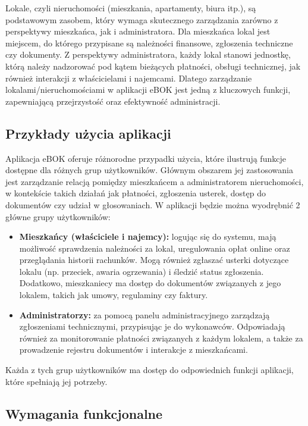 Lokale, czyli nieruchomości (mieszkania, apartamenty, biura itp.), są podstawowym zasobem, który wymaga skutecznego zarządzania zarówno z perspektywy mieszkańca, jak i administratora. Dla mieszkańca lokal jest miejscem, do którego przypisane są należności finansowe, zgłoszenia techniczne czy dokumenty. Z perspektywy administratora, każdy lokal stanowi jednostkę, którą należy nadzorować pod kątem bieżących płatności, obsługi technicznej, jak również interakcji z właścicielami i najemcami. Dlatego zarządzanie lokalami/nieruchomościami w aplikacji eBOK jest jedną z kluczowych funkcji, zapewniającą przejrzystość oraz efektywność administracji.

\subsection{Przykłady użycia aplikacji}

Aplikacja eBOK oferuje różnorodne przypadki użycia, które ilustrują funkcje dostępne dla różnych grup użytkowników. Głównym obszarem jej zastosowania jest zarządzanie relacją pomiędzy mieszkańcem a administratorem nieruchomości, w kontekście takich działań jak płatności, zgłoszenia usterek, dostęp do dokumentów czy udział w głosowaniach. W aplikacji będzie można wyodrębnić 2 główne grupy użytkowników:

\begin{itemize} 

	\item \textbf{Mieszkańcy (właściciele i najemcy):} logując się do systemu, mają możliwość sprawdzenia należności za lokal, uregulowania opłat online oraz przeglądania historii rachunków. Mogą również zgłaszać usterki dotyczące lokalu (np. przeciek, awaria ogrzewania) i śledzić status zgłoszenia. Dodatkowo, mieszkaniecy ma dostęp do dokumentów związanych z jego lokalem, takich jak umowy, regulaminy czy faktury.
	
	\item \textbf{Administratorzy:} za pomocą panelu administracyjnego zarządzają zgłoszeniami technicznymi, przypisując je do wykonawców. Odpowiadają również za monitorowanie płatności związanych z każdym lokalem, a także za prowadzenie rejestru dokumentów i interakcje z mieszkańcami.
	
\end{itemize}

Każda z tych grup użytkowników ma dostęp do odpowiednich funkcji aplikacji, które spełniają jej potrzeby.

\subsection{Wymagania funkcjonalne}

